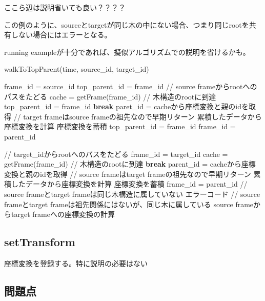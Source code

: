 \documentclass{jarticle}
\begin{document}
\begin{multicols}{2}
ここら辺は説明省いても良い？？？？

この例のように、sourceとtargetが同じ木の中にない場合、つまり同じrootを共有しない場合にはエラーとなる。


running exampleが十分であれば、擬似アルゴリズムでの説明を省けるかも。

\begin{algorithm}[H]
	\caption{walkToTopParent(time, source\_id, target\_id)}
	\begin{algorithmic}
	\STATE frame\_id = source\_id
	\STATE top\_parent\_id = frame\_id
	\STATE // source frameからrootへのパスをたどる
	\STATE cache = getFrame(frame\_id)
	\STATE // 木構造のrootに到達
	\STATE top\_parent\_id = frame\_id
	\STATE \textbf{break}
	\ENDIF
	\STATE paret\_id = cacheから座標変換と親のidを取得
	\STATE // target frameはsource frameの祖先なので早期リターン
	\STATE 累積したデータから座標変換を計算
	\ENDIF
	\STATE 座標変換を蓄積
	\STATE top\_parent\_id = frame\_id
	\STATE frame\_id = parent\_id
	\ENDWHILE
	
	\STATE // target\_idからrootへのパスをたどる
	\STATE frame\_id = target\_id
	\STATE cache = getFrame(frame\_id)
	\STATE // 木構造のrootに到達
	\STATE \textbf{break}
	\ENDIF
	\STATE parent\_id = cacheから座標変換と親のidを取得
	\STATE // source frameはtarget frameの祖先なので早期リターン
	\STATE 累積したデータから座標変換を計算
	\ENDIF
	\STATE 座標変換を蓄積
	\STATE frame\_id = parent\_id
	\ENDWHILE
	\STATE // source frameとtarget frameは同じ木構造に属していない
	\RETURN エラーコード
	\ENDIF
	\STATE // source frameとtarget frameは祖先関係にはないが、同じ木に属している
	\STATE source frameからtarget frameへの座標変換の計算
	\end{algorithmic}
\end{algorithm}




\subsection{setTransform}

座標変換を登録する。特に説明の必要はない

\subsection{問題点}


\end{multicols}
\end{document}
